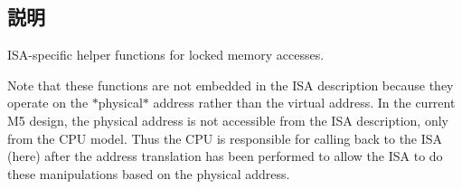 \subsection{説明}
ISA-\/specific helper functions for locked memory accesses.

Note that these functions are not embedded in the ISA description because they operate on the $\ast$physical$\ast$ address rather than the virtual address. In the current M5 design, the physical address is not accessible from the ISA description, only from the CPU model. Thus the CPU is responsible for calling back to the ISA (here) after the address translation has been performed to allow the ISA to do these manipulations based on the physical address. 